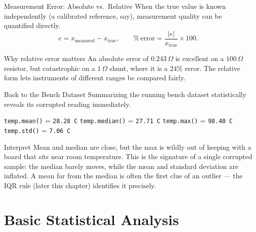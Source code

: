 \documentclass[9pt,aspectratio=169,xcolor=table]{beamer}
\begin{document}
\begin{frame}{Measurement Error: Absolute vs.\ Relative}
    \leavevmode
    When the true value is known independently (a calibrated reference,
    say), measurement quality can be quantified directly.
    \[
    e = x_{\text{measured}} - x_{\text{true}}, \qquad
    \%\,\text{error} = \frac{|e|}{x_{\text{true}}} \times 100 .
    \]

    \vspace{2mm}
    \begin{alertblock}{Why relative error matters}
        An absolute error of $0.243\,\Omega$ is excellent on a
        $100\,\Omega$ resistor, but \alert{catastrophic} on a
        $1\,\Omega$ shunt, where it is a $24\%$ error. The relative form
        lets instruments of different ranges be compared fairly.
    \end{alertblock}
\end{frame}

\begin{frame}{Back to the Bench Dataset}
    \leavevmode
    Summarizing the running bench dataset statistically reveals its
    corrupted reading immediately.

    \vspace{2mm}
    \texttt{temp.mean()} = \texttt{28.28 C} \quad
    \texttt{temp.median()} = \texttt{27.71 C} \quad
    \texttt{temp.max()} = \texttt{98.40 C} \quad
    \texttt{temp.std()} = \texttt{7.06 C}

    \vspace{3mm}
    \begin{block}{Interpret}
        \small Mean and median are close, but the max is wildly out of
        keeping with a board that sits near room temperature. This is
        the signature of a single corrupted sample: the
        \alert{median barely moves}, while the mean and standard
        deviation are inflated. A mean far from the median is often the
        first clue of an outlier --- the IQR rule (later this chapter)
        identifies it precisely.
    \end{block}
\end{frame}

\section{Basic Statistical Analysis}
\end{document}
